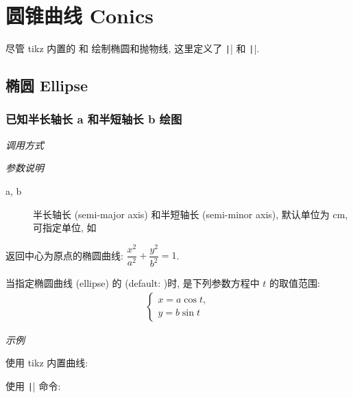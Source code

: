 \chapter{圆锥曲线 Conics}

尽管 tikz 内置的  和  绘制椭圆和抛物线,
这里定义了 \texttt|\ellipse| 和 \texttt|\parabola|.

\section{椭圆 Ellipse}

\subsection{已知半长轴长 a 和半短轴长 b 绘图}

\emph{调用方式}

\begin{tcolorbox}{}
\end{tcolorbox}

\emph{参数说明}

\begin{description}
  \item[a, b] 半长轴长 (semi-major axis) 和半短轴长 (semi-minor axis), 默认单位为 cm, 可指定单位, 如 \verbum{(4cm, 3cm)}
\end{description}

返回中心为原点的椭圆曲线: $\dfrac{x^2}{a^2}+\dfrac{y^2}{b^2}=1$.

\begin{remark*}
当指定椭圆曲线 (ellipse) 的  (default: )时,  是下列参数方程中 $t$ 的取值范围:
\begin{align*}
  \begin{cases}
  x = a \cos t,\\y = b \sin t
  \end{cases}
\end{align*}
\end{remark*}

\emph{示例}

使用 tikz 内置曲线:


使用 \texttt|\ellipse| 命令:


